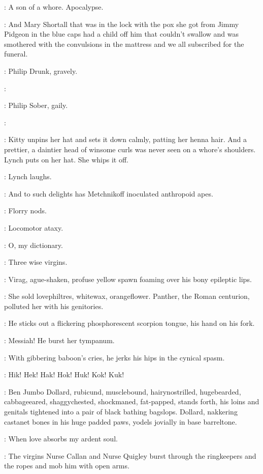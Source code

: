 \Virag:
A son of a whore.
Apocalypse.

\Kitty[2]:
And Mary Shortall that was in the lock with the pox
she got from Jimmy Pidgeon in the blue caps
had a child off him that couldn't swallow
and was smothered with the convulsions in the mattress
and we all subscribed for the funeral.

:
Philip Drunk, gravely.

\PhilipDrunk:

:
Philip Sober, gaily.

\PhilipSober:

:
Kitty unpins her hat and sets it down calmly, patting her henna hair.
And a prettier, a daintier head of winsome curls was never seen on a whore's shoulders.
Lynch puts on her hat.
She whips it off.

:
Lynch laughs.

\Lynch:
And to such delights has Metchnikoff inoculated anthropoid apes.

:
Florry nods.

\Florry:
Locomotor ataxy.

\Zoe:
O, my dictionary.

\Lynch:
Three wise virgins.

:
Virag, ague-shaken, profuse yellow spawn foaming over his bony epileptic lips.

\Virag:
She sold lovephiltres, whitewax, orangeflower.
Panther, the Roman centurion, polluted her with his genitories.

:
He sticks out a flickering phosphorescent scorpion tongue, his hand on his fork.

\Virag:
Messiah!
He burst her tympanum.

:
With gibbering baboon's cries, he jerks his hips in the cynical spasm.

\Virag:
Hik! Hek! Hak! Hok! Huk! Kok! Kuk!

:
Ben Jumbo Dollard, rubicund, musclebound, hairynostrilled, hugebearded,
cabbageeared, shaggychested, shockmaned, fat-papped, stands forth,
his loins and genitals tightened into a pair of black bathing bagslops.
Dollard, nakkering castanet bones in his huge padded paws,
yodels jovially in base barreltone.

\BenDollard:
When love absorbs my ardent soul.

:
The virgins Nurse Callan and Nurse Quigley burst through the ringkeepers
and the ropes and mob him with open arms.

